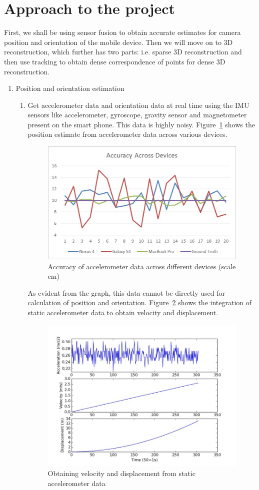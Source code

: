 \documentclass{article}
\begin{document}
	\section{Approach to the project} 
		First, we shall be using sensor fusion to obtain accurate estimates for camera position and orientation of the mobile device. Then we will move on to 3D reconstruction, which further has two parts: i.e. sparse 3D reconstruction and then use tracking to obtain dense correspondence of points for dense 3D reconstruction.
		\begin{enumerate}
			\item Position and orientation estimation
			\begin{enumerate}
				\item
					Get accelerometer data and orientation data at real time using the IMU sensors like accelerometer, gyroscope, gravity sensor and magnetometer present on the smart phone.
					This data is highly noisy. Figure~\ref{fig1} shows the position estimate from accelerometer data across various devices.

					\begin{figure}[ht!]
					\centering
					\includegraphics[width=10cm]{graph.jpg}
					\caption{Accuracy of accelerometer data across different devices (scale cm)\label{fig1}}
					\end{figure}

					As evident from the graph, this data cannot be directly used for calculation of position and orientation. 
					Figure~\ref{fig2} shows the integration of static accelerometer data to obtain velocity and displacement.

					\begin{figure}[ht!]
					\centering
					\includegraphics[width=10cm]{integration.jpg}
					\caption{Obtaining velocity and displacement from static accelerometer data\label{fig2}}
					\end{figure}


\end{enumerate}
\end{enumerate}
\end{document}
